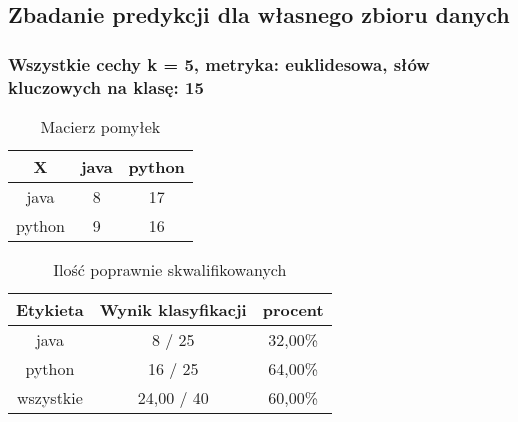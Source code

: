 \documentclass{classrep}
\begin{document}
\newpage
\subsection{Zbadanie predykcji dla własnego zbioru danych}

\subsubsection{Wszystkie cechy k = 5, metryka: euklidesowa, słów kluczowych na klasę: 15}
\begin{table}[h]
\centering
\begin{tabular}{|c|c|c|}
\hline
 X  & java & python\\
\hline
java & 8 & 17\\
\hline
python & 9 & 16\\
\hline
\end{tabular}
\caption{Macierz pomyłek}\end{table}

\begin{table}[h]
\centering
\begin{tabular}{|c|c|c|}
\hline
Etykieta & Wynik klasyfikacji & procent\\
\hline
java & 8 / 25 & 32,00\%\\
\hline
python & 16 / 25 & 64,00\%\\
\hline
wszystkie & 24,00 / 40 & 60,00\%\\
\hline
\end{tabular}
\caption{Ilość poprawnie skwalifikowanych}\end{table}
\end{document}

